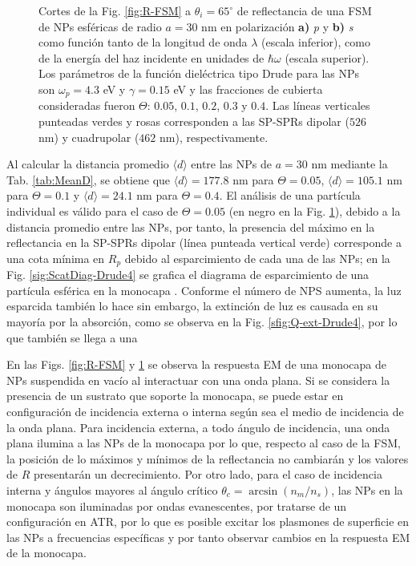 \begin{figure}[h!]
	\caption{Cortes de la Fig. \ref{fig:R-FSM} a $\theta_i = 65^\circ$ de reflectancia de una FSM de NPs esféricas de radio $a=30$ nm en polarización \textbf{a)} \emph{p} y \textbf{b)} \emph{s} como función tanto de la longitud de onda $\lambda$ (escala inferior), como de la energía del haz incidente en unidades de $\hbar\omega$ (escala superior). Los parámetros de la función dieléctrica tipo Drude para las NPs son $\omega_p = 4.3$ eV y $\gamma = 0.15$ eV y las fracciones de cubierta consideradas fueron $\Theta$: $0. 05$, $0. 1$, $0. 2$, $0. 3$ y $0. 4$. Las líneas verticales punteadas verdes y rosas corresponden a las SP-SPRs dipolar ($526$ nm) y cuadrupolar ($462$ nm), respectivamente.}\label{fig:FSM-Cuts}
	\end{figure}	

Al calcular la distancia promedio $\langle d \rangle$ entre las NPs  de $a = 30$ nm mediante la Tab. \eqref{tab:MeanD}, se obtiene que $\langle d \rangle = 177.8$ nm para $\Theta = 0.05$, $\langle d \rangle = 105.1$ nm para $\Theta = 0.1$ y $\langle d \rangle = 24.1$ nm para $\Theta = 0.4$. El análisis de una partícula individual es válido para el caso de $\Theta=0.05$ (en negro en la Fig. \ref{fig:FSM-Cuts}), debido a la distancia promedio entre las NPs, por tanto, la presencia del máximo en la reflectancia en la SP-SPRs dipolar (línea punteada vertical verde) corresponde a una cota mínima en $R_p$ debido al esparcimiento de cada una de las NPs; en la Fig. \ref{sig:ScatDiag-Drude4} se grafica el diagrama de esparcimiento de una partícula esférica en la monocapa . Conforme el número de NPS aumenta, la luz esparcida también lo hace sin embargo, la extinción de luz es causada en su mayoría por la absorción, como se observa en la Fig. \ref{sfig:Q-ext-Drude4}, por lo que también se llega a una

	

En las Figs. \ref{fig:R-FSM} y \ref{fig:FSM-Cuts} se observa la respuesta EM de una monocapa de NPs suspendida en vacío al interactuar con una onda plana. Si se considera la presencia de un sustrato que soporte la monocapa, se puede estar en configuraci\'on de incidencia externa o interna seg\'un sea el medio de incidencia de la onda plana. Para incidencia externa, a todo ángulo de incidencia,  una onda plana ilumina a las NPs de la monocapa por lo que, respecto al caso de la FSM, la posición de lo máximos y mínimos de la reflectancia no cambiarán y los valores de $R$ presentarán un decrecimiento. Por otro lado, para el caso de incidencia interna y ángulos mayores al ángulo crítico $\theta_c = \arcsin(n_m/n_s)$, las NPs en la monocapa son iluminadas por ondas evanescentes, por tratarse de un configuración en ATR, por lo que es posible excitar los plasmones de superficie en las NPs a frecuencias específicas y por tanto observar cambios en la respuesta EM de la monocapa.

